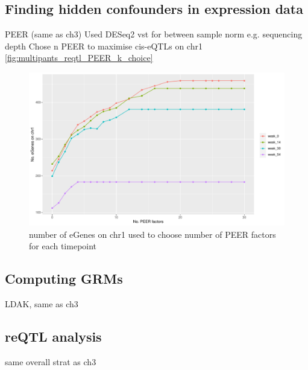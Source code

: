 \begin{outline}
\subsection{Finding hidden confounders in expression data}

\1 PEER (same as ch3)
    \2 Used DESeq2 vst for between sample norm e.g. sequencing depth 
    \2 Chose n PEER to maximise cis-eQTLs on chr1 \autoref{fig:multipants_reqtl_PEER_k_choice} 

\begin{figure}
    \centering
    \includegraphics[width=1.0\textwidth,page=1]{mainmatter/figures/chapter_04/count_eGenes.signif_eGenes_vs_PEER_n.dataset_multiPANTS.chr_1.pdf}
    \caption{number of eGenes on chr1 used to choose number of PEER factors for each timepoint}
    \label{fig:multipants_reqtl_PEER_k_choice}
\end{figure}

\subsection{Computing GRMs}

\1 LDAK, same as ch3

\subsection{reQTL analysis}

\1 same overall strat as ch3




\end{outline}
